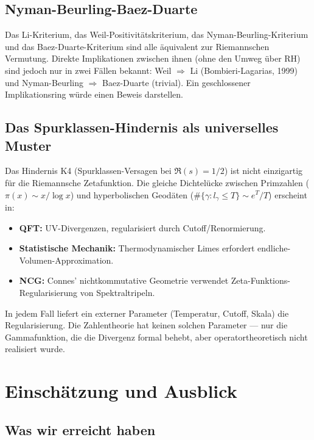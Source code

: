 \documentclass[12pt,a4paper]{article}
\theoremstyle{definition}
\theoremstyle{remark}
\begin{document}
\subsection{Nyman-Beurling-Baez-Duarte}

Das Li-Kriterium, das Weil-Positivitätskriterium, das Nyman-Beurling-Kriterium und das Baez-Duarte-Kriterium sind alle äquivalent zur Riemannschen Vermutung. Direkte Implikationen zwischen ihnen (ohne den Umweg über RH) sind jedoch nur in zwei Fällen bekannt: Weil $\Rightarrow$ Li (Bombieri-Lagarias, 1999) und Nyman-Beurling $\Rightarrow$ Baez-Duarte (trivial). Ein geschlossener Implikationsring würde einen Beweis darstellen.

\subsection{Das Spurklassen-Hindernis als universelles Muster}

Das Hindernis K4 (Spurklassen-Versagen bei $\Re(s) = 1/2$) ist nicht einzigartig für die Riemannsche Zetafunktion. Die gleiche Dichtelücke zwischen Primzahlen ($\pi(x) \sim x/\log x$) und hyperbolischen Geodäten ($\#\{\gamma: l_\gamma \leq T\} \sim e^T/T$) erscheint in:
\begin{itemize}
  \item \textbf{QFT:} UV-Divergenzen, regularisiert durch Cutoff/Renormierung.
  \item \textbf{Statistische Mechanik:} Thermodynamischer Limes erfordert endliche-Volumen-Approximation.
  \item \textbf{NCG:} Connes' nichtkommutative Geometrie verwendet Zeta-Funktions-Regularisierung von Spektraltripeln.
\end{itemize}
In jedem Fall liefert ein externer Parameter (Temperatur, Cutoff, Skala) die Regularisierung. Die Zahlentheorie hat keinen solchen Parameter --- nur die Gammafunktion, die die Divergenz formal behebt, aber operatortheoretisch nicht realisiert wurde.


\section{Einschätzung und Ausblick}
\label{sec:outlook}

\subsection{Was wir erreicht haben}
\end{document}
